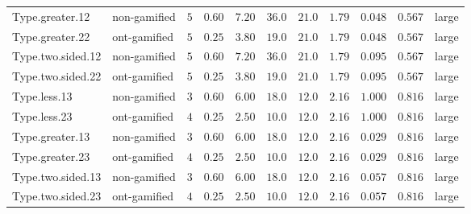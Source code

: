 \documentclass[6pt,a4paper]{article}
\begin{document}
{\begin{longtable}{llrrrrrrrrl}
Type.greater.12&non-gamified&$5$&$0.60$&$7.20$&$36.0$&$21.0$&$ 1.79$&$0.048$&$0.567$&large\tabularnewline
Type.greater.22&ont-gamified&$5$&$0.25$&$3.80$&$19.0$&$21.0$&$ 1.79$&$0.048$&$0.567$&large\tabularnewline
Type.two.sided.12&non-gamified&$5$&$0.60$&$7.20$&$36.0$&$21.0$&$ 1.79$&$0.095$&$0.567$&large\tabularnewline
Type.two.sided.22&ont-gamified&$5$&$0.25$&$3.80$&$19.0$&$21.0$&$ 1.79$&$0.095$&$0.567$&large\tabularnewline
Type.less.13&non-gamified&$3$&$0.60$&$6.00$&$18.0$&$12.0$&$ 2.16$&$1.000$&$0.816$&large\tabularnewline
Type.less.23&ont-gamified&$4$&$0.25$&$2.50$&$10.0$&$12.0$&$ 2.16$&$1.000$&$0.816$&large\tabularnewline
Type.greater.13&non-gamified&$3$&$0.60$&$6.00$&$18.0$&$12.0$&$ 2.16$&$0.029$&$0.816$&large\tabularnewline
Type.greater.23&ont-gamified&$4$&$0.25$&$2.50$&$10.0$&$12.0$&$ 2.16$&$0.029$&$0.816$&large\tabularnewline
Type.two.sided.13&non-gamified&$3$&$0.60$&$6.00$&$18.0$&$12.0$&$ 2.16$&$0.057$&$0.816$&large\tabularnewline
Type.two.sided.23&ont-gamified&$4$&$0.25$&$2.50$&$10.0$&$12.0$&$ 2.16$&$0.057$&$0.816$&large\tabularnewline
\hline
\end{longtable}}
\end{document}
